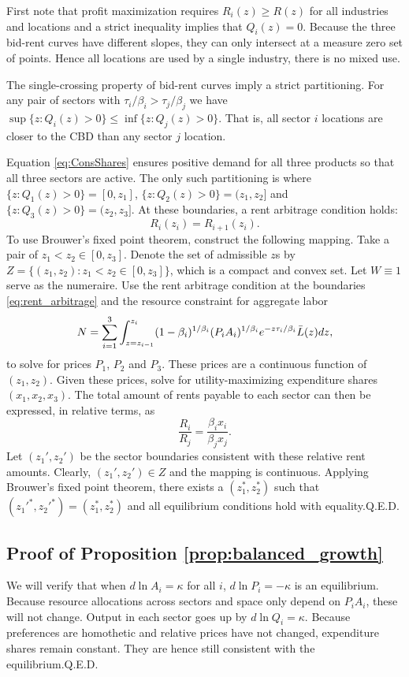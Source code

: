 \documentclass[12pt]{article}
\begin{document}
First note that profit maximization requires $R_i(z)\ge R(z)$ for all industries and locations and a strict inequality implies that $Q_i(z)=0$. Because the three bid-rent curves have different slopes, they can only intersect at a measure zero set of points. Hence all locations are used by a single industry, there is no mixed use.

The single-crossing property of bid-rent curves imply a strict partitioning. For any pair of sectors with $\tau_i/\beta_i>\tau_j/\beta_j$ we have $\sup\{z: Q_i(z)>0\} \le \inf\{z: Q_j(z)>0\}$. That is, all sector $i$ locations are closer to the CBD than any sector $j$ location. 

Equation \eqref{eq:ConsShares} ensures positive demand for all three products so that all three sectors are active. The only such partitioning is where $\{z: Q_1(z)>0\} = [0,z_1]$, $\{z: Q_2(z)>0\} = (z_1,z_2]$ and $\{z: Q_3(z)>0\} = (z_2,z_3]$. At these boundaries, a rent arbitrage condition holds:
\begin{equation}\label{eq:rent_arbitrage}
	R_i(z_i) = R_{i+1}(z_i).
\end{equation}
To use Brouwer's fixed point theorem, construct the following mapping. Take a pair of $z_1<z_2 \in [0,z_3]$. Denote the set of admissible $z$s by $Z=\{(z_1,z_2): z_1<z_2 \in [0,z_3]\}$, which is a compact and convex set. Let $W\equiv 1$ serve as the numeraire. Use the rent arbitrage condition at the boundaries \eqref{eq:rent_arbitrage} and the resource constraint for aggregate labor
\[
N = \sum_{i=1}^3 \int_{z=z_{i-1}}^{z_i}(1-\beta_i)^{1/\beta_i}
	(P_iA_i)^{1/\beta_i}
	e^{- z \tau_i/\beta_i}\Bar L(z)dz,
\] 
to solve for prices $P_1$, $P_2$ and $P_3$. These prices are a continuous function of $(z_1,z_2)$. 
Given these prices, solve for utility-maximizing expenditure shares $(x_1,x_2,x_3)$. The total amount of rents payable to each sector can then be expressed, in relative terms, as
\[
\frac {R_i}
	{R_j}
=
\frac {\beta_i x_i}
	{\beta_j x_j}.
\]
Let $(z_1',z_2')$ be the sector boundaries consistent with these relative rent amounts. Clearly, $(z_1',z_2')\in Z$ and the mapping is continuous. Applying Brouwer's fixed point theorem, there exists a $(z_1^*,z_2^*)$ such that $(z_1'^{*},z_2'^{*}) = (z_1^*,z_2^*)$ and all equilibrium conditions hold with equality.\hfill Q.E.D.

\subsection{Proof of Proposition \ref{prop:balanced_growth}}
We will verify that when $d\ln A_i=\kappa$ for all $i$, $d\ln P_i=-\kappa$ is an equilibrium. Because resource allocations across sectors and space only depend on $P_iA_i$, these will not change. Output in each sector goes up by $d\ln Q_i = \kappa$. Because preferences are homothetic and relative prices have not changed, expenditure shares remain constant. They are hence still consistent with the equilibrium.\hfill Q.E.D.
\end{document}
